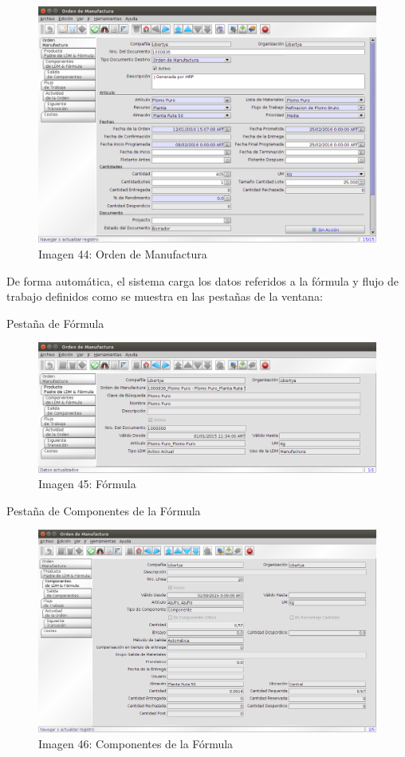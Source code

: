 \documentclass[letterpaper,10pt,spanish]{sphinxmanual}
\begin{document}
\begin{figure}[htbp]
\centering
\capstart

\includegraphics{ly_om_1.png}
\caption{Imagen 44: Orden de Manufactura}\end{figure}

De forma automática, el sistema carga los datos referidos a la fórmula y flujo de trabajo definidos como se muestra en las pestañas de la ventana:

Pestaña de Fórmula
\begin{figure}[htbp]
\centering
\capstart

\includegraphics{ly_om_2.png}
\caption{Imagen 45: Fórmula}\end{figure}

Pestaña de Componentes de la Fórmula
\begin{figure}[htbp]
\centering
\capstart

\includegraphics{ly_om_3.png}
\caption{Imagen 46: Componentes de la Fórmula}\end{figure}
\end{document}
